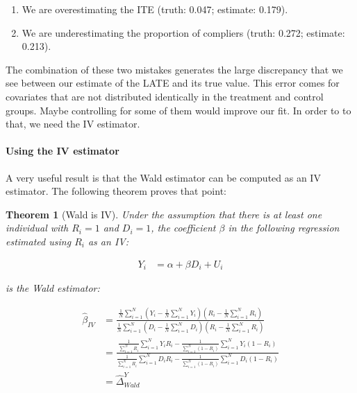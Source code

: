 \documentclass[
]{book}
\providecommand{\tightlist}{%
  \setlength{\itemsep}{0pt}\setlength{\parskip}{0pt}}
\newtheorem{theorem}{Theorem}[chapter]
\theoremstyle{definition}
\theoremstyle{definition}
\theoremstyle{definition}
\theoremstyle{definition}
\theoremstyle{remark}
\begin{document}
\begin{enumerate}
\def\labelenumi{\arabic{enumi}.}
\tightlist
\item
  We are overestimating the ITE (truth: 0.047; estimate: 0.179).
\item
  We are underestimating the proportion of compliers (truth: 0.272; estimate: 0.213).
\end{enumerate}

The combination of these two mistakes generates the large discrepancy that we see between our estimate of the LATE and its true value.
This error comes for covariates that are not distributed identically in the treatment and control groups.
Maybe controlling for some of them would improve our fit.
In order to to that, we need the IV estimator.

\hypertarget{using-the-iv-estimator}{%
\paragraph{Using the IV estimator}\label{using-the-iv-estimator}}

A very useful result is that the Wald estimator can be computed as an IV estimator.
The following theorem proves that point:

\begin{theorem}[Wald is IV]
\protect\hypertarget{thm:WaldIV}{}{\label{thm:WaldIV} \iffalse (Wald is IV) \fi{} }Under the assumption that there is at least one individual with \(R_i=1\) and \(D_i=1\), the coefficient \(\beta\) in the following regression estimated using \(R_i\) as an IV:

\begin{align*}
        Y_i &  = \alpha + \beta D_i + U_i
    \end{align*}

is the Wald estimator:

\begin{align*}
\hat{\beta}_{IV} & = \frac{\frac{1}{N}\sum_{i=1}^N\left(Y_i-\frac{1}{N}\sum_{i=1}^NY_i\right)\left(R_i-\frac{1}{N}\sum_{i=1}^NR_i\right)}{\frac{1}{N}\sum_{i=1}^N\left(D_i-\frac{1}{N}\sum_{i=1}^ND_i\right)\left(R_i-\frac{1}{N}\sum_{i=1}^NR_i\right)} \\
                                & = \frac{\frac{1}{\sum_{i=1}^N R_i}\sum_{i=1}^N Y_iR_i-\frac{1}{\sum_{i=1}^N (1-R_i)}\sum_{i=1}^N Y_i(1-R_i)}{\frac{1}{\sum_{i=1}^N R_i}\sum_{i=1}^N D_iR_i-\frac{1}{\sum_{i=1}^N (1-R_i)}\sum_{i=1}^N D_i(1-R_i)}\\
                  & = \hat{\Delta}^Y_{Wald} 
\end{align*}
\end{theorem}
\end{document}
